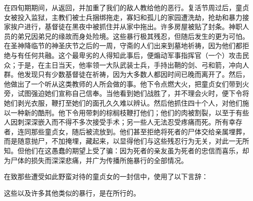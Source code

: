 在四旬期期间，从返回，并加重了我们的敌人教给他的恶行。复活节周过后，童贞女被投入监狱，主教们被士兵捆绑拖走，寡妇和孤儿的家园遭洗劫，抢劫和暴力接家挨户进行，基督徒在黑夜中被抓住并从家中拖出。许多房屋被贴了封条。神职人员的弟兄因弟兄的缘故而身处险境。这些暴行极其残忍，但随后发生的更为可怕。在圣神降临节的神圣庆节之后的一周，守斋的人们出来到墓地祈祷，因为他们都拒绝与有任何共融。这个最卑劣的人得知此事后，便煽动军事指挥官（一个）攻击民众；于是，在主日当天，他率领一大队武装士兵，手持出鞘的剑、弓和箭，冲向人群。他发现只有少数基督徒在祈祷，因为大多数人都因时间已晚而离开了。然后，他做出了一个听从这类教师的人所会做的事。他下令点燃大火，把童贞女们带到火旁，试图强迫她们宣称自己信奉。当他看到她们战胜了，并不理会火时，便下令将她们剥光衣服，鞭打至她们的面孔久久难以辨认。然后他抓住四十个人，对他们施以一种新的酷刑。他下令用带刺的棕榈枝鞭打他们；他们的肉被割裂，以至于有些人因刺深深嵌入而不得不多次接受手术；另一些人无法忍受疼痛而死。所有幸存者，连同那些童贞女，随后被流放到。他们甚至拒绝将死者的尸体交给亲属埋葬，而是随意抛尸，不加掩埋，藏起来，以显得他们与这些残忍行为无关，对此一无所知。但他们在这愚蠢的期望上受了骗：因为死者的亲友虽为死者的忠信而喜乐，却为尸体的损失而深深悲痛，并广为传播所施暴行的全部情况。\par

\par

在致那些遭受如此野蛮对待的童贞女的一封信中，使用了以下言辞：\par

这些以及许多其他类似的暴行，是在所行的。\par

